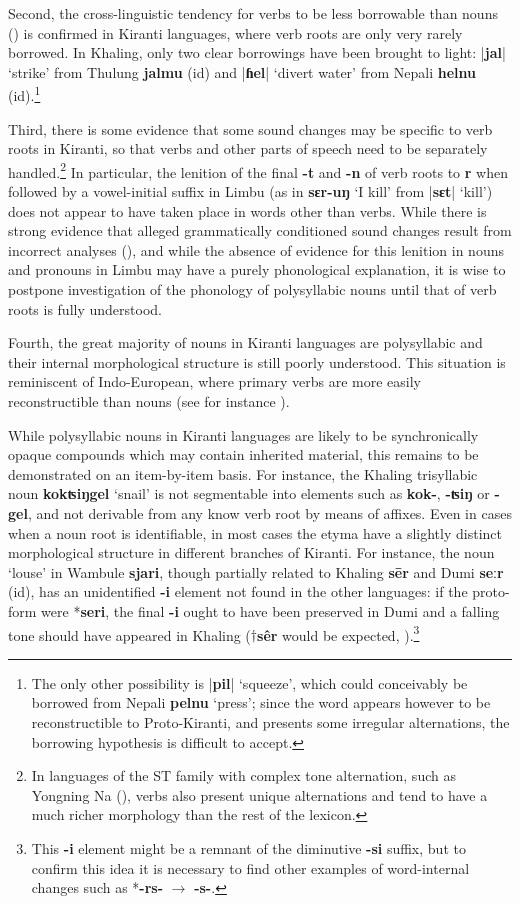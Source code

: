 \documentclass[oldfontcommands,oneside,a4paper,11pt]{article}
\newcommand{\ipa}[1]{\textbf{{\phon\mbox{#1}}}} %
\newcommand{\dhatu}[2]{|\ipa{#1}| `#2'}
\newcommand{\change}[2]{*\ipa{#1} $\rightarrow$ \ipa{#2}}
\begin{document}
Second, the cross-linguistic tendency for verbs to be less borrowable than nouns (\citealt{wohlgemuth09verbal}) is confirmed in Kiranti languages, where verb roots are only very rarely borrowed. In Khaling, only two clear borrowings have been brought to light: \dhatu{jal}{strike} from Thulung \ipa{jalmu}  (id) and \dhatu{ɦel}{divert water} from Nepali \ipa{helnu} (id).\footnote{The only other possibility is  \dhatu{pil}{squeeze}, which could conceivably be borrowed from Nepali \ipa{pelnu} `press'; since the word appears however to be reconstructible to Proto-Kiranti, and presents some irregular alternations, the borrowing hypothesis is difficult to accept.} 

Third, there is some evidence that some sound changes may be specific to verb roots in Kiranti, so that verbs and other parts of speech need to be separately handled.\footnote{In languages of the ST family with complex tone alternation, such as Yongning Na (\citealt{michaud08na}), verbs also present unique alternations and tend to have a much richer morphology than the rest of the lexicon.} In particular, the lenition of the final \ipa{-t} and \ipa{-n} of verb roots to \ipa{r} when followed by a vowel-initial suffix in Limbu (as in \ipa{sɛr-uŋ}  `I kill' from \dhatu{sɛt}{kill}) does not appear to have taken place in words other than verbs. While there is strong evidence that alleged grammatically conditioned sound changes result from incorrect analyses (\citealt{hill14conditioned}), and while the absence of evidence for this lenition in nouns and pronouns in Limbu may have a purely phonological explanation, it is wise to postpone investigation of the phonology of polysyllabic nouns until that of verb roots is fully understood.

Fourth, the great majority of nouns in Kiranti languages are polysyllabic and their internal morphological structure is still poorly understood. This situation is reminiscent of Indo-European, where primary verbs are more easily reconstructible than nouns (see for instance \citealt{garnier10vocalisme}).

While polysyllabic nouns in Kiranti languages are likely to be synchronically opaque compounds which may contain inherited material, this remains to be demonstrated on an item-by-item basis.  For instance, the Khaling trisyllabic noun \ipa{kokʦiŋgel} `snail' is not segmentable into elements such as \ipa{kok-}, \ipa{-ʦiŋ} or \ipa{-gel}, and not derivable from any know verb root by means of affixes. Even in cases when a noun root is identifiable, in most cases the etyma have a slightly distinct morphological structure in different branches of Kiranti. For instance, the noun `louse' in Wambule \ipa{sjari}, though partially related to Khaling \ipa{sēr} and Dumi \ipa{seːr} (id), has an unidentified \ipa{-i} element not found in the other languages: if the proto-form were *\ipa{seri}, the final \ipa{-i} ought to have been preserved in Dumi and a falling tone should have appeared in Khaling ($\dagger$\ipa{sêr} would be expected, \citealt{jacques16tonogenesis}).\footnote{This \ipa{-i} element might be a remnant of the diminutive \ipa{-si} suffix, but to confirm this idea it is necessary to find other examples of word-internal changes such as \change{-rs-}{-s-}. }
\end{document}
